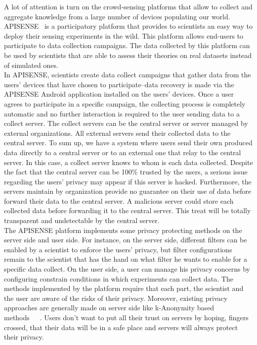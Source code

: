 


A lot of attention is turn on the crowd-sensing platforms that allow to collect and aggregate knowledge from a large number of devices populating our world.
APISENSE~\cite{DBLP:conf/dais/HadererRS13} is a participatory platform that provides to scientists an easy way to deploy their sensing experiments in the wild.
This platform allows end-users to participate to data collection campaigns.
The data collected by this platform can be used by scientists that are able to assess their theories on real datasets instead of simulated ones.
\\

In APISENSE, scientists create data collect campaigns that gather data from the users' devices that have chosen to participate--data recovery is made via the APISENSE Android application installed on the users' devices.
Once a user agrees to participate in a specific campaign, the collecting process is completely automatic and no further interaction is required to the user sending data to a collect server.
The collect servers can be the central server or server managed by external organizations.
All external servers send their collected data to the central server.
To sum up, we have a system where users send their own produced data directly to a central server or to an external one that relay to the central server.
In this case, a collect server knows to whom is each data collected.
Despite the fact that the central server can be 100\% trusted by the users, a serious issue regarding the users' privacy may appear if this server is hacked.
Furthermore, the servers maintain by organization provide no guarantee on their use of data before forward their data to the central server.
A malicious server could store each collected data before forwarding it to the central server.
This treat will be totally transparent and undetectable by the central server.
\\

The APISENSE platform implements some privacy protecting methods on the server side and user side.
For instance, on the server side, different filters can be enabled by a scientist to enforce the users' privacy, but filter configurations remain to the scientist that has the hand on what filter he wants to enable for a specific data collect.
On the user side, a user can manage his privacy concerns by configuring constrain conditions in which experiments can collect data.
The methods implemented by the platform require that each part, the scientist and the user are aware of the risks of their privacy.
Moreover, existing privacy approaches are generally made on server side like k-Anonymity based methods~\cite{DBLP:journals/ijufks/Sweene02}~\cite{DBLP:conf/icde/LiLV07}~\cite{DBLP:conf/icde/MachanavajjhalaGKV06}.
Users don't want to put all their trust on servers by hoping, fingers crossed, that their data will be in a safe place and servers will always protect their privacy.
\\

